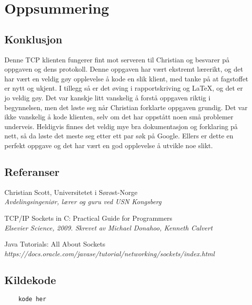 \section{Oppsummering}
\subsection{Konklusjon}
Denne TCP klienten fungerer fint mot serveren til Christian og besvarer på oppgaven og dens protokoll. Denne oppgaven har vært ekstremt lærerikt, og det har vært en veldig gøy opplevelse å kode en slik klient, med tanke på at fagstoffet er nytt og ukjent. I tillegg så er det øving i rapportskriving og LaTeX, og det er jo veldig gøy. Det var kanskje litt vanskelig å forstå oppgaven riktig i begynnelsen, men det løste seg når Christian forklarte oppgaven grundig. Det var ikke vanskelig å kode klienten, selv om det har oppstått noen små problemer underveis. Heldigvis finnes det veldig mye bra dokumentasjon og forklaring på nett, så da løste det meste seg etter ett par søk på Google. Ellers er dette en perfekt oppgave og det har vært en god opplevelse å utvikle noe slikt.

\subsection{Referanser}
\renewcommand{\section}[2]{}
\begin{thebibliography}{50}
		Christian Scott, Universitetet i Sørøst-Norge\\
		\textit{Avdelingsingeniør, lærer og guru ved USN Kongsberg}

		TCP/IP Sockets in C: Practical Guide for Programmers\\
		\textit{Elsevier Science, 2009. Skrevet av Michael Donahoo, Kenneth Calvert}

		Java Tutorials: All About Sockets
		\\\textit{https://docs.oracle.com/javase/tutorial/networking/sockets/index.html}
\end{thebibliography}
	
\newpage
\subsection{Kildekode}
\begin{lstlisting}
	kode her
\end{lstlisting}
